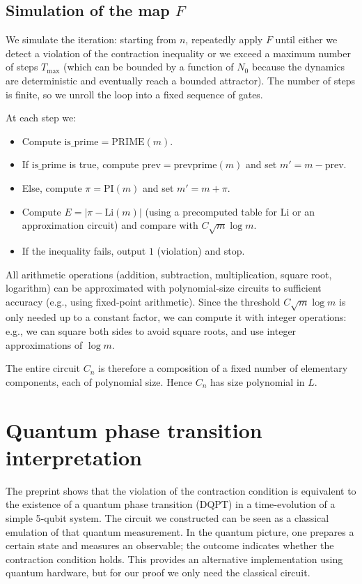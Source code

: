 \documentclass[11pt,a4paper]{article}
\begin{document}
\subsection{Simulation of the map \(F\)}
We simulate the iteration: starting from \(n\), repeatedly apply \(F\) until either we detect a violation of the contraction inequality or we exceed a maximum number of steps \(T_{\max}\) (which can be bounded by a function of \(N_0\) because the dynamics are deterministic and eventually reach a bounded attractor). The number of steps is finite, so we unroll the loop into a fixed sequence of gates.

At each step we:
\begin{itemize}
\item Compute \( \text{is\_prime} = \mathrm{PRIME}(m) \).
\item If \(\text{is\_prime}\) is true, compute \( \text{prev} = \mathrm{prevprime}(m) \) and set \(m' = m - \text{prev}\).
\item Else, compute \(\pi = \mathrm{PI}(m)\) and set \(m' = m + \pi\).
\item Compute \(E = |\pi - \mathrm{Li}(m)|\) (using a precomputed table for \(\mathrm{Li}\) or an approximation circuit) and compare with \(C \sqrt{m} \log m\).
\item If the inequality fails, output \(1\) (violation) and stop.
\end{itemize}

All arithmetic operations (addition, subtraction, multiplication, square root, logarithm) can be approximated with polynomial‑size circuits to sufficient accuracy (e.g., using fixed‑point arithmetic). Since the threshold \(C \sqrt{m} \log m\) is only needed up to a constant factor, we can compute it with integer operations: e.g., we can square both sides to avoid square roots, and use integer approximations of \(\log m\).

The entire circuit \(C_n\) is therefore a composition of a fixed number of elementary components, each of polynomial size. Hence \(C_n\) has size polynomial in \(L\).

\section{Quantum phase transition interpretation}

The preprint \cite{quantum2025} shows that the violation of the contraction condition is equivalent to the existence of a quantum phase transition (DQPT) in a time‑evolution of a simple 5‑qubit system. The circuit we constructed can be seen as a classical emulation of that quantum measurement. In the quantum picture, one prepares a certain state and measures an observable; the outcome indicates whether the contraction condition holds. This provides an alternative implementation using quantum hardware, but for our proof we only need the classical circuit.
\end{document}
